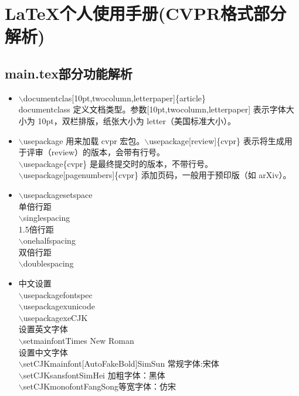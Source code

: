 \section{LaTeX个人使用手册(CVPR格式部分解析)}
\subsection{main.tex部分功能解析}
\begin{itemize}
    \item  $\backslash$documentclas[10pt,twocolumn,letterpaper]\{article\}\\
    documentclass 定义文档类型。参数[10pt,twocolumn,letterpaper] 表示字体大小为 10pt，双栏排版，纸张大小为 letter（美国标准大小）。
    \item $\backslash$usepackage 用来加载 cvpr 宏包。$\backslash$usepackage[review]\{cvpr\} 表示将生成用于评审（review）的版本，会带有行号。\\
    $\backslash$usepackage\{cvpr\} 是最终提交时的版本，不带行号。\\
    $\backslash$usepackage[pagenumbers]\{cvpr\} 添加页码，一般用于预印版（如 arXiv）。
    \item  $\backslash$usepackage{setspace}\\
    单倍行距\\
    $\backslash$singlespacing\\
    1.5倍行距\\
    $\backslash$onehalfspacing\\
    双倍行距\\
    $\backslash$doublespacing
    \item 中文设置 \\
    $\backslash$usepackage{fontspec}\\
    $\backslash$usepackage{xunicode}\\
    $\backslash$usepackage{xeCJK}
    \\设置英文字体\\
    $\backslash$setmainfont{Times New Roman}
    \\ 设置中文字体\\
    $\backslash$setCJKmainfont[AutoFakeBold]{SimSun} 常规字体:宋体 \\  
    $\backslash$setCJKsansfont{SimHei} 加粗字体：黑体\\   
    $\backslash$setCJKmonofont{FangSong}等宽字体：仿宋
\end{itemize}
